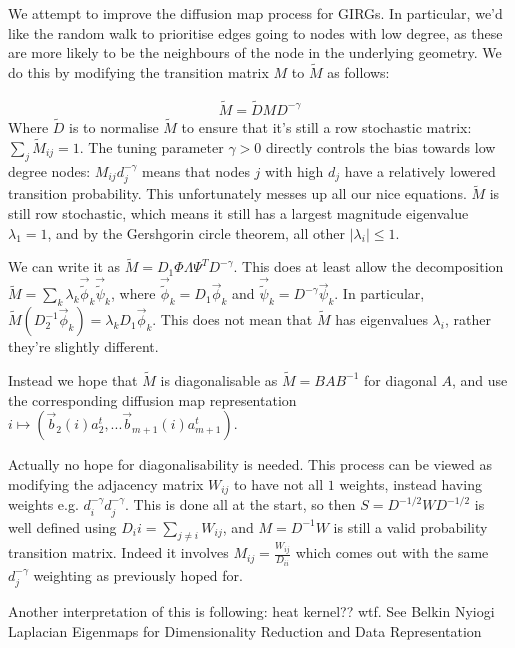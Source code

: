 We attempt to improve the diffusion map process for GIRGs. In particular, we'd like the random walk to prioritise edges going to nodes with low degree, as these are more likely to be the neighbours of the node in the underlying geometry. We do this by modifying the transition matrix $M$ to $\tilde{M}$ as follows:

\begin{align*}
  \tilde{M} = \tilde{D} M D^{-\gamma}
\end{align*}
Where $\tilde{D}$ is to normalise $\tilde{M}$ to ensure that it's still a row stochastic matrix: $\sum_j \tilde{M}_{ij} = 1$. The tuning parameter $\gamma > 0$ directly controls the bias towards low degree nodes: $M_{ij} d^{-\gamma}_j$ means that nodes $j$ with high $d_j$ have a relatively lowered transition probability.
This unfortunately messes up all our nice equations. $\tilde{M}$ is still row stochastic, which means it still has a largest magnitude eigenvalue $\lambda_1 = 1$, and by the Gershgorin circle theorem, all other $|\lambda_i| \leq 1$.

We can write it as $\tilde{M} = D_1 \Phi \Lambda \Psi^T D^{-\gamma}$. This does at least allow the decomposition $\tilde{M} = \sum_k \lambda_k \vec{\tilde{\phi}}_k \vec{\tilde{\psi}}_k$, where $\vec{\tilde{\phi}}_k = D_1 \vec{\phi}_k$ and $\vec{\tilde{\psi}}_k = D^{-\gamma} \vec{\psi}_k$. In particular, $\tilde{M} (D_2^{-1} \vec{\phi}_k) = \lambda_k D_1 \vec{\phi}_k$. This does not mean that $\tilde{M}$ has eigenvalues $\lambda_i$, rather they're slightly different.

Instead we hope that $\tilde{M}$ is diagonalisable as $\tilde{M} = BAB^{-1}$ for diagonal $A$, and use the corresponding diffusion map representation $i \mapsto (\vec{b}_2(i) a_2^t,... \vec{b}_{m+1}(i) a_{m+1}^t)$.

Actually no hope for diagonalisability is needed. This process can be viewed as modifying the adjacency matrix $W_{ij}$ to have not all $1$ weights, instead having weights e.g. $d_i^{-\gamma}d_j^{-\gamma}$. This is done all at the start, so then $S = D^{-1/2} W D^{-1/2}$ is well defined using $D_ii = \sum_{j \neq i} W_{ij}$, and $M = D^{-1} W$ is still a valid probability transition matrix. Indeed it involves $M_{ij} = \frac{W_{ij}}{D_{ii}}$ which comes out with the same $d_j^{-\gamma}$ weighting as previously hoped for.

Another interpretation of this is following:
heat kernel?? wtf. See Belkin Nyiogi Laplacian Eigenmaps for Dimensionality Reduction and Data Representation

